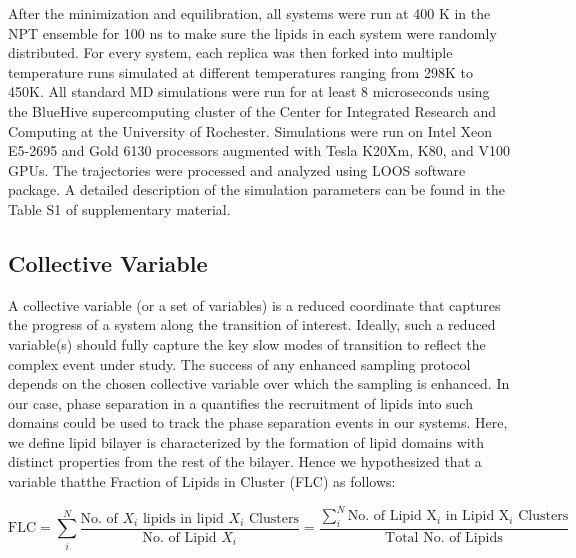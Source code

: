 \documentclass{biophys-new}
\begin{document}
After the minimization and equilibration, all systems were run at 400 K in the NPT ensemble for 100 ns to make sure the lipids in each system were
randomly distributed.
For every system, each replica was then forked into multiple temperature runs simulated at different temperatures ranging from 298K to 450K. 
All standard MD simulations were run for at least 8 microseconds using the BlueHive supercomputing cluster of the Center for Integrated Research and
Computing at the University of Rochester. Simulations were run on Intel Xeon E5-2695 and Gold 6130 processors augmented with Tesla K20Xm, K80, and V100 GPUs.   
The trajectories were processed and analyzed using LOOS software package.
A detailed description of the simulation parameters can be found in the Table S1 of supplementary material.  

\subsection*{Collective Variable}

A collective variable (or a set of variables) is a reduced coordinate that captures the progress of a system along the transition of interest.
Ideally, such a reduced variable(s) should fully capture the key slow modes of transition to reflect the complex event under study.
The success of any enhanced sampling protocol depends on the chosen collective variable over which the sampling is enhanced. 
In our case, phase separation in a  quantifies the recruitment of lipids into such domains could be used to track the phase separation
events in our systems. Here, we define lipid bilayer is characterized by the formation of lipid domains with distinct properties from the rest of the bilayer.
Hence we hypothesized that a variable thatthe Fraction of Lipids in Cluster (FLC) as follows:

\begin{equation}
\label{eq:CLT}
\text{FLC} = \sum_{i}^{N} \frac{\text{No. of $X_i$ lipids in lipid $X_i$ Clusters}}{\text{No. of Lipid $X_i$}} =  \frac{\sum_{i}^{N} \text{No. of Lipid X$_i$ in Lipid X$_i$ Clusters}}{\text{Total No. of Lipids}}
\end{equation}
\end{document}
